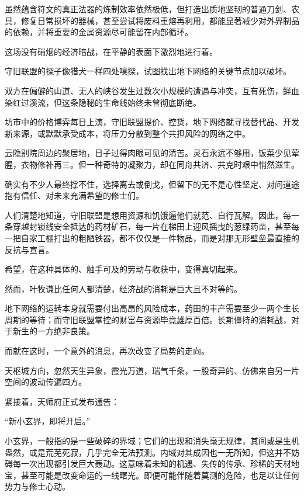 虽然蕴含符文的真正法器的炼制效率依然极低，但打造出质地坚韧的普通刀剑、农具，修复日常损坏的器械，甚至尝试将废料重熔再利用，都能显著减少对外界制品的依赖，并将重要的金属资源尽可能留在内部循环。

\vspace{2em}

这场没有硝烟的经济暗战，在平静的表面下激烈地进行着。

守旧联盟的探子像猎犬一样四处嗅探，试图找出地下网络的关键节点加以破坏。

双方在偏僻的山道、无人的峡谷发生过数次小规模的遭遇与冲突，互有死伤，鲜血染红过溪流，但这条隐秘的生命线始终未曾彻底断绝。

坊市中的价格博弈每日上演，守旧联盟提价、控货，地下网络就寻找替代品、开发新来源，或默默承受成本，将压力分散到整个共担风险的网络之中。

云隐别院周边的聚居地，日子过得肉眼可见的清苦。灵石永远不够用，饭菜少见荤腥，衣物修补再三。但一种奇特的凝聚力，却在同舟共济、共克时艰中悄然滋生。

确实有不少人最终撑不住，选择离去或倒戈，但留下的无不是心性坚定、对问道途抱有信任、对未来充满希望的修士们。

人们清楚地知道，守旧联盟是想用资源和饥饿逼他们就范、自行瓦解。因此，每一条穿越封锁线安全抵达的药材矿石，每一片在梯田上迎风摇曳的葱绿药苗，甚至每一把自家工棚打出的粗陋铁器，都不仅仅是一件物品，而是对那无形壁垒最直接的反抗与宣言。

希望，在这种具体的、触手可及的劳动与收获中，变得真切起来。

然而，叶牧谦比任何人都清楚，经济战的消耗是巨大且不对等的。

地下网络的运转本身就需要付出高昂的风险成本，药田的丰产需要至少一两个生长周期的等待；而守旧联盟掌控的财富与资源毕竟雄厚百倍。长期僵持的消耗战，对于新生的一方绝非良策。

而就在这时，一个意外的消息，再次改变了局势的走向。

\vspace{2em}

天枢城方向，忽然天生异象，霞光万道，瑞气千条，一股奇异的、仿佛来自另一片空间的波动传遍四方。

紧接着，天师府正式发布通告：

“新小玄界，即将开启。”

小玄界，一般指的是一些破碎的界域；它们的出现和消失毫无规律，其间或是生机盎然，或是荒芜死寂，几乎完全无法预测。内域对其成因也一无所知，但这并不妨碍每一次出现都引发巨大轰动。这意味着未知的机遇、失传的传承、珍稀的天材地宝，甚至可能是改变命运的一线曙光。即便可能伴随着莫测的危险，也足以让任何势力与修士心动。

